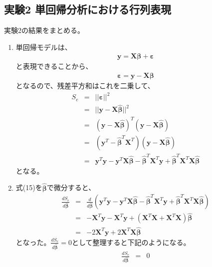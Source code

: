 \documentclass[12pt]{jarticle}
\begin{document}
\subsection{実験2 単回帰分析における行列表現}
\begin{shadebox}
    実験2の結果をまとめる。
\end{shadebox}
\begin{enumerate}
    \item 単回帰モデルは、
          \begin{eqnarray}
              \bm y=\bm X \bm \beta+ \bm \varepsilon \nonumber
          \end{eqnarray}
          と表現できることから、
          \begin{eqnarray}
              \bm \varepsilon =\bm y-\bm X \bm \beta \nonumber
          \end{eqnarray}
          となるので、残差平方和はこれを二乗して、
          \begin{eqnarray}
              S_e&=& ||\bm \varepsilon||^2\nonumber \\
              &=&||\bm y-\bm X  \hat{\bm \beta}||^2 \nonumber\\
              &=&(\bm y-\bm X  \hat{\bm \beta})^T(\bm y-\bm X  \hat{\bm \beta}) \nonumber\\
              &=&(\bm y^T-\hat{\bm \beta}^T\bm X^T)(\bm y-\bm X  \hat{\bm \beta}) \nonumber\\
              &=&\bm y^T\bm y-\bm y^T\bm X\hat{\bm \beta}-\hat{\bm \beta}^T\bm X^T\bm y+\hat{\bm \beta}^T\bm X^T\bm X  \hat{\bm \beta}
          \end{eqnarray}
          となる。
    \item 式(15)を$\hat{\bm \beta}$で微分すると、
          \begin{eqnarray}
              \frac{ dS_e}{d\hat{\bm \beta}} &=&\frac{d}{d\hat{\bm \beta}}( \bm y^T\bm y-\bm y^T\bm X\hat{\bm \beta}-\hat{\bm \beta}^T\bm X^T\bm y+\hat{\bm \beta}^T\bm X^T\bm X  \hat{\bm \beta}) \nonumber \\
              &=&-\bm X^T\bm y-\bm X^T\bm y+(\bm X^T\bm X+\bm X^T\bm X)  \hat{\bm \beta} \nonumber \\
              &=&-2\bm X^T\bm y+2\bm X^T\bm X\hat{\bm \beta}
          \end{eqnarray}
          となった。$\frac{ dS_e}{d\hat{\bm \beta}}=0$として整理すると下記のようになる。
          \begin{eqnarray}
              \frac{ dS_e}{d\hat{\bm \beta}} &=&0 \nonumber \\

\end{eqnarray}
\end{enumerate}
\end{document}
